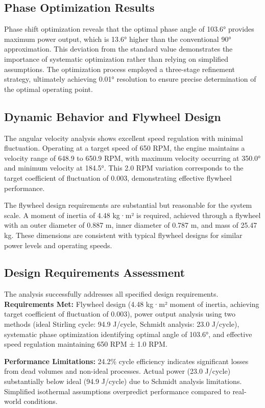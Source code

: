 \documentclass[12pt]{article}
\begin{document}
\subsection{Phase Optimization Results}
Phase shift optimization reveals that the optimal phase angle of 103.6° provides maximum power output, which is 13.6° higher than the conventional 90° approximation. This deviation from the standard value demonstrates the importance of systematic optimization rather than relying on simplified assumptions. The optimization process employed a three-stage refinement strategy, ultimately achieving 0.01° resolution to ensure precise determination of the optimal operating point.

\subsection{Dynamic Behavior and Flywheel Design}
The angular velocity analysis shows excellent speed regulation with minimal fluctuation. Operating at a target speed of 650 RPM, the engine maintains a velocity range of 648.9 to 650.9 RPM, with maximum velocity occurring at 350.0° and minimum velocity at 184.5°. This 2.0 RPM variation corresponds to the target coefficient of fluctuation of 0.003, demonstrating effective flywheel performance.

The flywheel design requirements are substantial but reasonable for the system scale. A moment of inertia of 4.48 kg·m² is required, achieved through a flywheel with an outer diameter of 0.887 m, inner diameter of 0.787 m, and mass of 25.47 kg. These dimensions are consistent with typical flywheel designs for similar power levels and operating speeds.

\subsection{Design Requirements Assessment}
The analysis successfully addresses all specified design requirements. \textbf{Requirements Met:} Flywheel design (4.48 kg·m² moment of inertia, achieving target coefficient of fluctuation of 0.003), power output analysis using two methods (ideal Stirling cycle: 94.9 J/cycle, Schmidt analysis: 23.0 J/cycle), systematic phase optimization identifying optimal angle of 103.6°, and effective speed regulation maintaining 650 RPM ± 1.0 RPM.

\textbf{Performance Limitations:} 24.2\% cycle efficiency indicates significant losses from dead volumes and non-ideal processes. Actual power (23.0 J/cycle) substantially below ideal (94.9 J/cycle) due to Schmidt analysis limitations. Simplified isothermal assumptions overpredict performance compared to real-world conditions.
\end{document}
